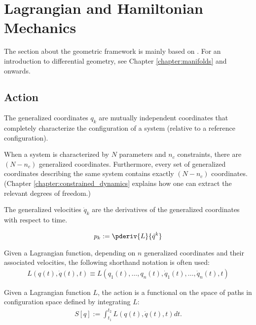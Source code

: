 \chapter{Lagrangian and Hamiltonian Mechanics}\label{chapter:lagrange}

    The section about the geometric framework is mainly based on \cite{arnold, palais_solitons}. For an introduction to differential geometry, see Chapter \ref{chapter:manifolds} and onwards.

\section{Action}

    \begin{definition}
        The generalized coordinates $q_k$ are mutually independent coordinates that completely characterize the configuration of a system (relative to a reference configuration).

        When a system is characterized by $N$ parameters and $n_c$ constraints, there are $(N-n_c)$ generalized coordinates. Furthermore, every set of generalized coordinates describing the same system contains exactly $(N-n_c)$ coordinates. (Chapter \ref{chapter:constrained_dynamics} explains how one can extract the relevant degrees of freedom.)
    \end{definition}
    \begin{definition}
        The generalized velocities $\dot{q}_k$ are the derivatives of the generalized coordinates with respect to time.
    \end{definition}
    \begin{definition}\label{lagrange:conjugate_momentum}
        \begin{gather}
            p_k := \pderiv{L}{\dot{q}^k}
        \end{gather}
    \end{definition}

    \begin{notation}\label{lagrange:notational_convention_1}
        Given a Lagrangian function, depending on $n$ generalized coordinates and their associated velocities, the following shorthand notation is often used:
        \begin{gather}
            L\left(q(t),\dot{q}(t),t\right) \equiv L\left(q_1(t),\ldots,q_n(t),\dot{q}_1(t),\ldots,\dot{q}_n(t),t\right)
        \end{gather}
    \end{notation}
    \begin{definition}[Action]\label{lagrange:action}
        Given a Lagrangian function $L$, the action is a functional on the space of paths in configuration space defined by integrating $L$:
        \begin{gather}
            S[q] := \int_{t_1}^{t_2}L\left(q(t),\dot{q}(t),t\right)dt.
        \end{gather}
    \end{definition}

